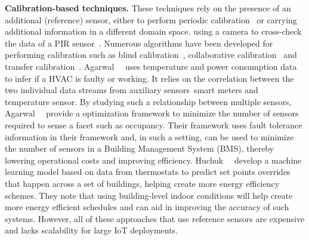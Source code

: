 \textbf{Calibration-based techniques.} These techniques rely on the presence of an additional (reference) sensor, either to perform periodic calibration~\cite{whitehouse2002calibration, 8405565} or carrying additional information in a different domain space.  \Eg using a camera to cross-check the data of a PIR sensor~\cite{tang2017occupancy}. Numerous algorithms have been developed for performing calibration such as blind calibration~\cite{7472216, 7495010}, collaborative calibration~\cite{10.1145/2737095.2737113, 10.1145/2185677.2185687} and transfer calibration~\cite{article_nose}. Agarwal~\etal~\cite{Agarwal2021ANA} uses temperature and power consumption data to infer if a HVAC is faulty or working. It relies on the correlation between the two individual data streams from auxiliary sensors~\viz smart meters and temperature sensor. By studying such a relationship between multiple sensors, Agarwal~\etal~\cite{Agarwal2022ANA} provide a optimization framework to minimize the number of sensors required to sense a facet such as occupancy. Their framework uses fault tolerance information in their framework and, in such a setting, \sol can be used to minimize the number of sensors in a Building Management System (BMS), thereby lowering operational costs and improving efficiency. Huchuk~\etal~\cite{huchuk2021data} develop a machine learning model based on data from thermostats to predict set points overrides that happen across a set of buildings, helping create more energy efficiency schemes. They note that using building-level indoor conditions will help create more energy efficient schedules and \sol can aid in improving the accuracy of such systems. However, all of these approaches that use reference sensors are expensive and lacks scalability for large IoT deployments. %

